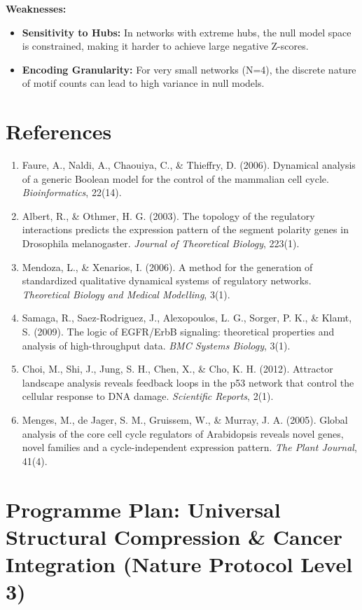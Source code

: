 \documentclass{article}
\begin{document}
\textbf{Weaknesses:}
\begin{itemize}
    \item \textbf{Sensitivity to Hubs:} In networks with extreme hubs, the null model space is constrained, making it harder to achieve large negative Z-scores.
    \item \textbf{Encoding Granularity:} For very small networks (N=4), the discrete nature of motif counts can lead to high variance in null models.
\end{itemize}

\section{References}
\begin{enumerate}
    \item Faure, A., Naldi, A., Chaouiya, C., \& Thieffry, D. (2006). Dynamical analysis of a generic Boolean model for the control of the mammalian cell cycle. \textit{Bioinformatics}, 22(14).
    \item Albert, R., \& Othmer, H. G. (2003). The topology of the regulatory interactions predicts the expression pattern of the segment polarity genes in Drosophila melanogaster. \textit{Journal of Theoretical Biology}, 223(1).
    \item Mendoza, L., \& Xenarios, I. (2006). A method for the generation of standardized qualitative dynamical systems of regulatory networks. \textit{Theoretical Biology and Medical Modelling}, 3(1).
    \item Samaga, R., Saez-Rodriguez, J., Alexopoulos, L. G., Sorger, P. K., \& Klamt, S. (2009). The logic of EGFR/ErbB signaling: theoretical properties and analysis of high-throughput data. \textit{BMC Systems Biology}, 3(1).
    \item Choi, M., Shi, J., Jung, S. H., Chen, X., \& Cho, K. H. (2012). Attractor landscape analysis reveals feedback loops in the p53 network that control the cellular response to DNA damage. \textit{Scientific Reports}, 2(1).
    \item Menges, M., de Jager, S. M., Gruissem, W., \& Murray, J. A. (2005). Global analysis of the core cell cycle regulators of Arabidopsis reveals novel genes, novel families and a cycle-independent expression pattern. \textit{The Plant Journal}, 41(4).
\end{enumerate}



\section{Programme Plan: Universal Structural Compression \& Cancer Integration (Nature Protocol Level 3)}
\end{document}
